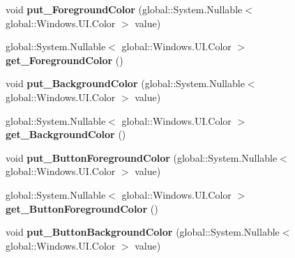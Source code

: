 \begin{DoxyCompactItemize}
void {\bfseries put\+\_\+\+Foreground\+Color} (global\+::\+System.\+Nullable$<$ global\+::\+Windows.\+U\+I.\+Color $>$ value)
\item 
\mbox{\label{class_windows_1_1_u_i_1_1_view_management_1_1_application_view_title_bar_a0100947ed3af490212e529dba4a068e8}} 
global\+::\+System.\+Nullable$<$ global\+::\+Windows.\+U\+I.\+Color $>$ {\bfseries get\+\_\+\+Foreground\+Color} ()
\item 
\mbox{\label{class_windows_1_1_u_i_1_1_view_management_1_1_application_view_title_bar_a72763c5790a08759eb3aa7f1a034cc1c}} 
void {\bfseries put\+\_\+\+Background\+Color} (global\+::\+System.\+Nullable$<$ global\+::\+Windows.\+U\+I.\+Color $>$ value)
\item 
\mbox{\label{class_windows_1_1_u_i_1_1_view_management_1_1_application_view_title_bar_a10d72a066c2702f38e96eb1f3702b5ab}} 
global\+::\+System.\+Nullable$<$ global\+::\+Windows.\+U\+I.\+Color $>$ {\bfseries get\+\_\+\+Background\+Color} ()
\item 
\mbox{\label{class_windows_1_1_u_i_1_1_view_management_1_1_application_view_title_bar_a607b5d86c746c6283c118cc8e983990a}} 
void {\bfseries put\+\_\+\+Button\+Foreground\+Color} (global\+::\+System.\+Nullable$<$ global\+::\+Windows.\+U\+I.\+Color $>$ value)
\item 
\mbox{\label{class_windows_1_1_u_i_1_1_view_management_1_1_application_view_title_bar_aae493d2a3fa93365f753e29b776af821}} 
global\+::\+System.\+Nullable$<$ global\+::\+Windows.\+U\+I.\+Color $>$ {\bfseries get\+\_\+\+Button\+Foreground\+Color} ()
\item 
\mbox{\label{class_windows_1_1_u_i_1_1_view_management_1_1_application_view_title_bar_a4bf81ad5fba26dac4114c2caf024a7a9}} 
void {\bfseries put\+\_\+\+Button\+Background\+Color} (global\+::\+System.\+Nullable$<$ global\+::\+Windows.\+U\+I.\+Color $>$ value)

\end{DoxyCompactItemize}
